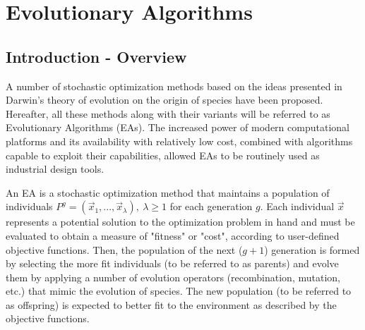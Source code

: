 \chapter{Evolutionary Algorithms} %


\ifpdf
    \graphicspath{{2/figures/PNG/}{2/figures/PDF/}{2/figures/}}
\else
    \graphicspath{{2/figures/EPS/}{2/figures/}}
\fi


\section{Introduction - Overview}
A number of stochastic optimization methods based on the ideas presented in Darwin's theory of evolution on the origin of species \cite{Darwin} have been proposed. Hereafter, all these methods along with their variants will be referred to as Evolutionary Algorithms (EAs). The increased power of modern computational platforms and its availability with relatively low cost, combined with algorithms capable to exploit their capabilities,  allowed EAs to be routinely used as industrial design tools.     

An EA is a stochastic optimization method that maintains a population of individuals $P^g=(\vec{x}_1,...,\vec{x}_{\lambda}),~\lambda \ge 1$ for each generation $g$. Each individual $\vec{x}$ represents a potential solution to the optimization problem in hand and must be evaluated to obtain a measure of "fitness" or "cost", according to user-defined objective functions. Then, the population of the next ($g+1$) generation is formed by selecting the more fit individuals (to be referred to as parents) and evolve them by applying a number of evolution operators (recombination, mutation, etc.) that mimic the evolution of species. The new population (to be referred to as offspring) is expected to better fit to the environment as described by the objective functions.     


